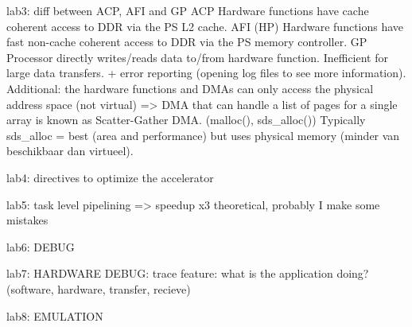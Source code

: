 lab3: diff between ACP, AFI and GP
	ACP	Hardware functions have cache coherent access to DDR via the PS L2 cache.
	AFI (HP)	Hardware functions have fast non-cache coherent access to DDR via the PS memory controller.
	GP	Processor directly writes/reads data to/from hardware function. Inefficient for large data transfers.
+ error reporting (opening log files to see more information).
Additional: the hardware functions and DMAs can only access the physical address space (not virtual) => DMA that can handle a list of pages for a single array is known as Scatter-Gather DMA. (malloc(), sds\_alloc()) Typically sds\_alloc = best (area and performance) but uses physical memory (minder van beschikbaar dan virtueel).

lab4: directives to optimize the accelerator

lab5: task level pipelining
	=> speedup x3 theoretical, probably I make some mistakes

lab6: DEBUG

lab7: HARDWARE DEBUG: trace feature: what is the application doing? (software, hardware, transfer, recieve)

lab8: EMULATION
